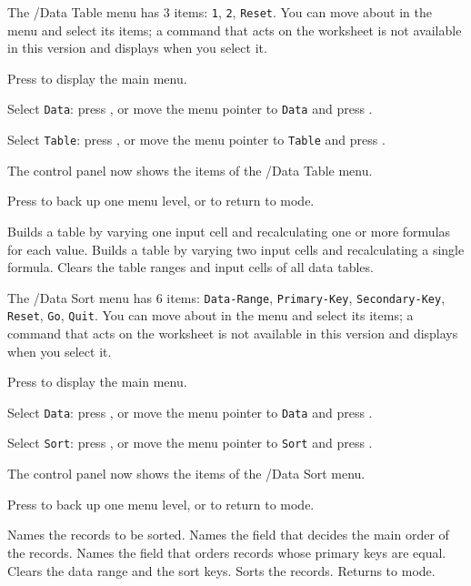 The /Data Table menu has 3 items: \texttt{1}, \texttt{2}, \texttt{Reset}.  You can move about in the menu and select its items; a command that acts on the worksheet is not available in this version and displays  when you select it.
\begin{Steps123}
\item Press  to display the main menu.
\item Select \texttt{Data}: press , or move the menu pointer to \texttt{Data} and press .
\item Select \texttt{Table}: press , or move the menu pointer to \texttt{Table} and press .
\item The control panel now shows the items of the /Data Table menu.
\item Press  to back up one menu level, or  to return to  mode.
\end{Steps123}
\begin{Options}
 Builds a table by varying one input cell and recalculating one or more formulas for each value.
 Builds a table by varying two input cells and recalculating a single formula.
 Clears the table ranges and input cells of all data tables.
\end{Options}

The /Data Sort menu has 6 items: \texttt{Data-Range}, \texttt{Primary-Key}, \texttt{Secondary-Key}, \texttt{Reset}, \texttt{Go}, \texttt{Quit}.  You can move about in the menu and select its items; a command that acts on the worksheet is not available in this version and displays  when you select it.
\begin{Steps123}
\item Press  to display the main menu.
\item Select \texttt{Data}: press , or move the menu pointer to \texttt{Data} and press .
\item Select \texttt{Sort}: press , or move the menu pointer to \texttt{Sort} and press .
\item The control panel now shows the items of the /Data Sort menu.
\item Press  to back up one menu level, or  to return to  mode.
\end{Steps123}
\begin{Options}
 Names the records to be sorted.
 Names the field that decides the main order of the records.
 Names the field that orders records whose primary keys are equal.
 Clears the data range and the sort keys.
 Sorts the records.
 Returns to  mode.
\end{Options}

